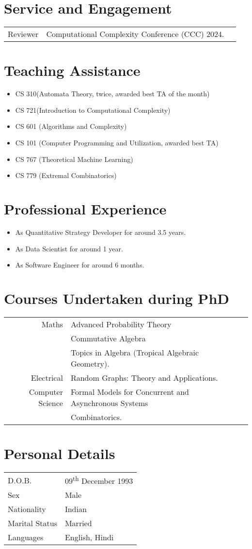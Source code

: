 \documentclass[a4paper,10pt]{article}
\begin{document}
\section{Service and Engagement}
\begin{tabular}{p{2.5cm}|p{11cm}l}
  Reviewer & Computational Complexity Conference (CCC) 2024.
\end{tabular}

\section{Teaching Assistance}

\begin{itemize}
  \item CS 310(Automata Theory, twice, awarded best TA of the month)
  \item CS 721(Introduction to Computational Complexity)
  \item CS 601 (Algorithms and Complexity)
  \item CS 101 (Computer Programming and Utilization, awarded best TA)
  \item CS 767 (Theoretical Machine Learning)
  \item CS 779 (Extremal Combinatorics)
\end{itemize}

\section{Professional Experience}

\begin{itemize}
  \item As Quantitative Strategy Developer for around 3.5 years.
  \item As Data Scientist for around 1 year.
  \item As Software Engineer for around 6 months.
\end{itemize}

\section{Courses Undertaken during PhD}

\begin{tabular}{rp{11cm}l}
  Maths & Advanced Probability Theory\\ & Commutative Algebra\\ & Topics in Algebra (Tropical Algebraic Geometry). \\
  Electrical & Random Graphs: Theory and Applications. \\
  Computer Science & Formal Models for Concurrent and Asynchronous Systems\\ & Combinatorics.
\end{tabular}

\section{Personal Details}

\begin{tabular}{ll}
  D.O.B. & 09\textsuperscript{th} December 1993 \\
  Sex & Male \\
  Nationality & Indian \\
  Marital Status & Married \\
  Languages & English, Hindi
\end{tabular}
\end{document}
